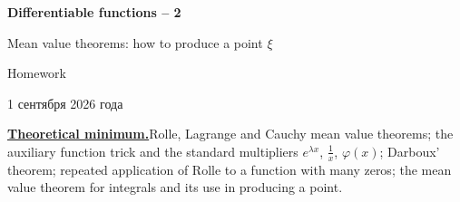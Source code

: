 \documentclass[11pt,a4paper]{article}
\begin{document}
\begin{center}
{\huge\bfseries Differentiable functions -- 2\par}\vspace{1.07em}
{\Large Mean value theorems: how to produce a point $\xi$\par}\vspace{1.1em}
{\Large Homework\par}\vspace{1.1em}
{\foreignlanguage{russian}{1 сентября 2026 года}\par}
\end{center}\vspace{0pt}

\noindent\textbf{\underline{Theoretical minimum.}}\quad Rolle, Lagrange and Cauchy mean value theorems;
the auxiliary function trick and the standard multipliers $e^{\lambda x}$, $\frac1x$, $\varphi(x)$; Darboux'
theorem; repeated application of Rolle to a function with many zeros; the mean value theorem for
integrals and its use in producing a point.
\end{document}
